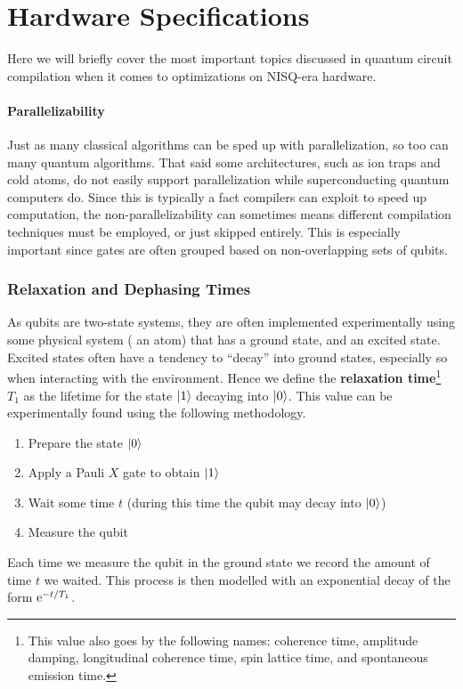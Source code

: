 \section{Hardware Specifications}

Here we will briefly cover the most important topics discussed in quantum circuit compilation when it comes to optimizations on \ac{NISQ}-era hardware.

\paragraph{Parallelizability}
Just as many classical algorithms can be sped up with parallelization, so too can many quantum algorithms.
That said some architectures, such as ion traps and cold atoms, do not easily support parallelization while superconducting quantum computers do.
Since this is typically a fact compilers can exploit to speed up computation, the non-parallelizability can sometimes means different compilation techniques must be employed, or just skipped entirely.
This is especially important since gates are often grouped based on non-overlapping sets of qubits.

\subsubsection{Relaxation and Dephasing Times}\label{sec:Ttimes}

As qubits are two-state systems, they are often implemented experimentally using some physical system (\eg{} an atom) that has a ground state, and an excited state.
Excited states often have a tendency to ``decay'' into ground states, especially so when interacting with the environment.
Hence we define the \textbf{relaxation time}\footnote{This value also goes by the following names: coherence time, amplitude damping, longitudinal coherence time, spin lattice time, and spontaneous emission time.} $T_1$ as the lifetime for the state $\ket{1}$ decaying into $\ket{0}$.
This value can be experimentally found using the following methodology.
\begin{enumerate}
    \item Prepare the state $\ket{0}$
    \item Apply a Pauli $X$ gate to obtain $\ket{1}$
    \item Wait some time $t$ (during this time the qubit may decay into $\ket{0}$)
    \item Measure the qubit
\end{enumerate}
Each time we measure the qubit in the ground state we record the amount of time $t$ we waited.
This process is then modelled with an exponential decay of the form $\mathrm{e}^{-t/T_1}$.

